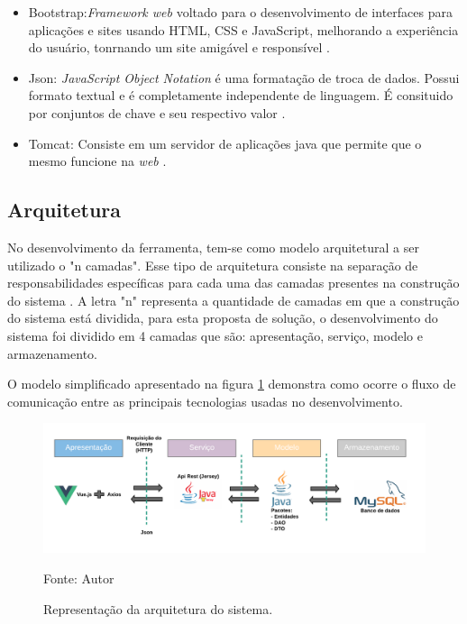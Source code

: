 \begin{itemize}
	\item Bootstrap:\textit{Framework web} voltado para o desenvolvimento de interfaces para aplicações e sites usando HTML, CSS e JavaScript, melhorando
		a experiência do usuário, tonrnando um site amigável e responsível \cite{bootstrap}.
	\item Json: \textit{JavaScript Object Notation} é uma formatação de troca de dados. Possui formato textual e é completamente independente de linguagem. É
		consituido por conjuntos de chave e seu respectivo valor \cite{json}.
	\item Tomcat: Consiste em um servidor de aplicações java que permite que o mesmo funcione na \textit{web} \cite{tomcat}.

\end{itemize}

\subsection{Arquitetura}

No desenvolvimento da ferramenta, tem-se como modelo arquitetural a ser utilizado o "n camadas". Esse tipo
de arquitetura consiste na separação de responsabilidades específicas para cada uma das camadas presentes 
na construção do sistema \cite{MSF}. A letra "n" representa a quantidade de camadas em que a construção do sistema 
está dividida, para esta proposta de solução, o desenvolvimento do sistema foi dividido em 4 camadas que são: apresentação, serviço, modelo
e armazenamento.

O modelo simplificado apresentado na figura \ref{arquitetura} demonstra como ocorre o fluxo de comunicação entre as principais tecnologias
usadas no desenvolvimento.

\begin{figure}[h]
	\centering
	\includegraphics[keepaspectratio=true,scale=0.8]{figuras/arquitetura.png}
	\caption{Representação da arquitetura do sistema.}
	Fonte: {Autor}
	\label{arquitetura}
\end{figure}		

